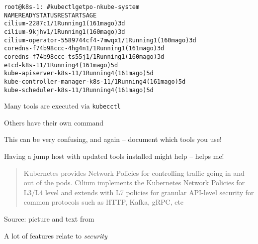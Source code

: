 \documentclass[Screen16to9,17pt]{foils}
\begin{document}
\begin{alltt}\footnotesize
root@k8s-1:~# kubectl get po -n kube-system
NAME                               READY   STATUS    RESTARTS       AGE
cilium-2287c                       1/1     Running   1 (161m ago)   3d
cilium-9kjhv                       1/1     Running   1 (160m ago)   3d
cilium-operator-5589744cf4-7mwqx   1/1     Running   1 (160m ago)   3d
coredns-f74b98ccc-4hg4n            1/1     Running   1 (161m ago)   3d
coredns-f74b98ccc-ts55j            1/1     Running   1 (160m ago)   3d
etcd-k8s-1                         1/1     Running   4 (161m ago)   5d
kube-apiserver-k8s-1               1/1     Running   4 (161m ago)   5d
kube-controller-manager-k8s-1      1/1     Running   4 (161m ago)   5d
kube-scheduler-k8s-1               1/1     Running   4 (161m ago)   5d
\end{alltt}




\begin{list2}
\item Many tools are executed via \verb+kubecctl+
\item Others have their own command
\item This can be very confusing, and again -- document which tools you use!
\item Having a jump host with updated tools installed might help -- helps me!
\end{list2}



\begin{quote}
Kubernetes provides Network Policies for controlling traffic going in and out of the pods. Cilium implements the Kubernetes Network Policies for L3/L4 level and extends with L7 policies for granular API-level security for common protocols such as HTTP, Kafka, gRPC, etc
\end{quote}
Source: picture and text from 




\begin{list2}
\item A lot of features relate to \emph{security}
\end{list2}
\end{document}
